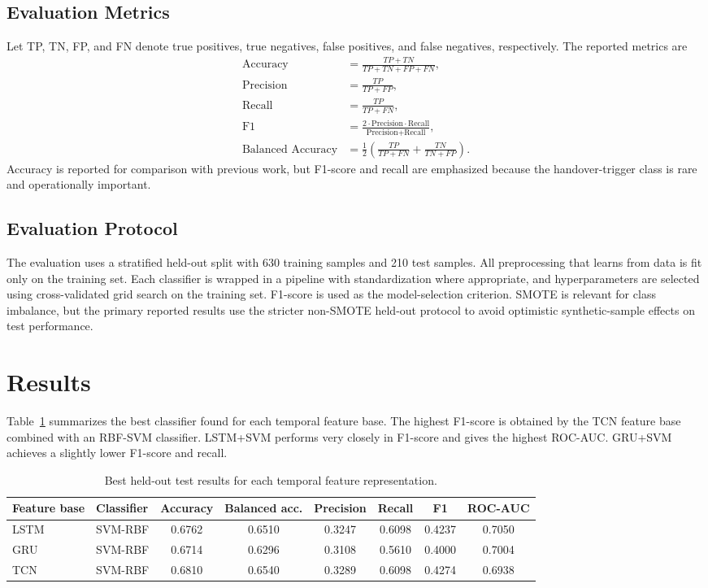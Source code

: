 \documentclass[conference]{IEEEtran}
\begin{document}
\subsection{Evaluation Metrics}
Let TP, TN, FP, and FN denote true positives, true negatives, false positives, and false negatives, respectively. The reported metrics are
\begin{align}
\text{Accuracy} &= \frac{TP+TN}{TP+TN+FP+FN}, \\
\text{Precision} &= \frac{TP}{TP+FP}, \\
\text{Recall} &= \frac{TP}{TP+FN}, \\
\text{F1} &= \frac{2\cdot \text{Precision}\cdot \text{Recall}}{\text{Precision}+\text{Recall}}, \\
\text{Balanced Accuracy} &= \frac{1}{2}\left(\frac{TP}{TP+FN}+\frac{TN}{TN+FP}\right).
\end{align}
Accuracy is reported for comparison with previous work, but F1-score and recall are emphasized because the handover-trigger class is rare and operationally important.

\subsection{Evaluation Protocol}
The evaluation uses a stratified held-out split with 630 training samples and 210 test samples. All preprocessing that learns from data is fit only on the training set. Each classifier is wrapped in a pipeline with standardization where appropriate, and hyperparameters are selected using cross-validated grid search on the training set. F1-score is used as the model-selection criterion. SMOTE \cite{chawla2002} is relevant for class imbalance, but the primary reported results use the stricter non-SMOTE held-out protocol to avoid optimistic synthetic-sample effects on test performance.

\section{Results}
Table~\ref{tab:best} summarizes the best classifier found for each temporal feature base. The highest F1-score is obtained by the TCN feature base combined with an RBF-SVM classifier. LSTM+SVM performs very closely in F1-score and gives the highest ROC-AUC. GRU+SVM achieves a slightly lower F1-score and recall.

\begin{table}[t]
\centering
\caption{Best held-out test results for each temporal feature representation.}
\label{tab:best}
\begin{tabular}{l l c c c c c c}
\toprule
Feature base & Classifier & Accuracy & Balanced acc. & Precision & Recall & F1 & ROC-AUC \\
\midrule
LSTM & SVM-RBF & 0.6762 & 0.6510 & 0.3247 & 0.6098 & 0.4237 & 0.7050 \\
GRU & SVM-RBF & 0.6714 & 0.6296 & 0.3108 & 0.5610 & 0.4000 & 0.7004 \\
TCN & SVM-RBF & 0.6810 & 0.6540 & 0.3289 & 0.6098 & 0.4274 & 0.6938 \\
\bottomrule
\end{tabular}
\end{table}
\end{document}
